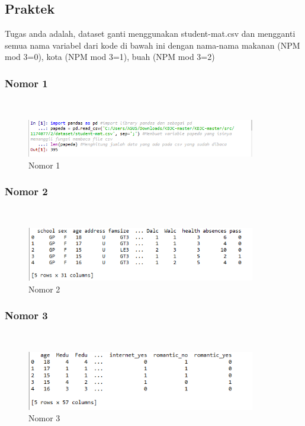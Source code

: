 \subsection{Praktek}
Tugas anda adalah, dataset ganti menggunakan student-mat.csv dan mengganti semua nama variabel dari kode di bawah ini dengan nama-nama makanan (NPM mod 3=0), kota (NPM mod 3=1), buah (NPM mod 3=2)
 

\subsubsection{Nomor 1}
\hfill\\

\begin{figure}[H]
\centerline{\includegraphics[width=10cm]{figures/1174077/2/p1.png}}
\caption{Nomor 1}
\label{labelgambar}
\end{figure}

\subsubsection{Nomor 2}
\hfill\\

\begin{figure}[H]
\centerline{\includegraphics[width=10cm]{figures/1174077/2/p2.png}}
\caption{Nomor 2}
\label{labelgambar}
\end{figure}

\subsubsection{Nomor 3}
\hfill\\

\begin{figure}[H]
\centerline{\includegraphics[width=10cm]{figures/1174077/2/p3.png}}
\caption{Nomor 3}
\label{labelgambar}
\end{figure}

